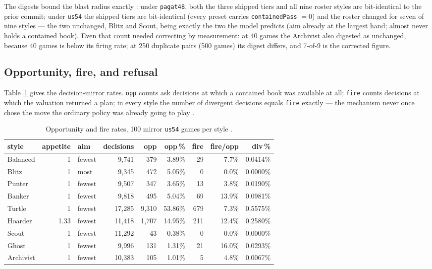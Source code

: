 \documentclass[11pt]{article}
\newcommand{\code}[1]{\texttt{#1}}
\begin{document}
The digests bound the blast radius exactly \cite{styles}: under
\code{pagat48}, both the three shipped tiers and all nine roster styles are
bit-identical to the prior commit; under \code{us54} the shipped tiers are
bit-identical (every preset carries \code{containedPass} $=0$) and the roster
changed for seven of nine styles --- the two unchanged, Blitz and Scout, being
exactly the two the model predicts (aim already at the largest hand; almost
never holds a contained book). Even that count needed correcting by
measurement: at 40 games the Archivist also digested as unchanged, because 40
games is below its firing rate; at 250 duplicate pairs (500 games) its digest
differs, and 7-of-9 is the corrected figure.

\subsection{Opportunity, fire, and refusal}
\label{sec:fire}

Table~\ref{tab:fire} gives the decision-mirror rates. \code{opp} counts ask
decisions at which a contained book was available at all; \code{fire} counts
decisions at which the valuation returned a plan; in every style the number of
divergent decisions equals \code{fire} exactly --- the mechanism never once
chose the move the ordinary policy was already going to play \cite{styles}.

\begin{table}[ht]
\centering
\caption{Opportunity and fire rates, 100 mirror \code{us54} games per style
\cite{styles}.}
\label{tab:fire}
\small
\begin{tabular}{@{}l r l r r r r r r@{}}
\toprule
style & appetite & aim & decisions & opp & opp\,\% & fire & fire/opp & div\,\% \\
\midrule
Balanced  & 1    & fewest & 9{,}741  & 379    & 3.89\%  & 29  & 7.7\%  & 0.0414\% \\
Blitz     & 1    & most   & 9{,}345  & 472    & 5.05\%  & 0   & 0.0\%  & 0.0000\% \\
Punter    & 1    & fewest & 9{,}507  & 347    & 3.65\%  & 13  & 3.8\%  & 0.0190\% \\
Banker    & 1    & fewest & 9{,}818  & 495    & 5.04\%  & 69  & 13.9\% & 0.0981\% \\
Turtle    & 1    & fewest & 17{,}285 & 9{,}310 & 53.86\% & 679 & 7.3\%  & 0.5575\% \\
Hoarder   & 1.33 & fewest & 11{,}418 & 1{,}707 & 14.95\% & 211 & 12.4\% & 0.2580\% \\
Scout     & 1    & fewest & 11{,}292 & 43     & 0.38\%  & 0   & 0.0\%  & 0.0000\% \\
Ghost     & 1    & fewest & 9{,}996  & 131    & 1.31\%  & 21  & 16.0\% & 0.0293\% \\
Archivist & 1    & fewest & 10{,}383 & 105    & 1.01\%  & 5   & 4.8\%  & 0.0067\% \\
\bottomrule
\end{tabular}
\end{table}
\end{document}
